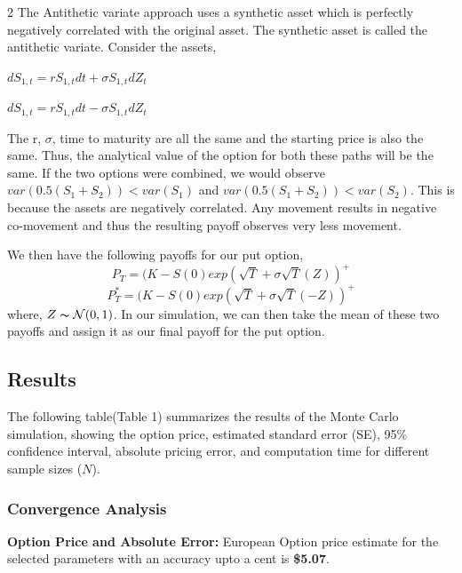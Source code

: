 \begin{multicols}{2}
The Antithetic variate approach uses a synthetic asset which is perfectly negatively correlated with the original asset. The synthetic asset is called the antithetic variate. Consider the assets,

$dS_{1,t} = rS_{1,t}dt + \sigma S_{1,t}dZ_t$

$dS_{1,t} = rS_{1,t}dt - \sigma S_{1,t}dZ_t$

The r, $\sigma$, time to maturity are all the same and the starting price is also the same. Thus, the analytical value of the option for both these paths will be the same. If the two options were combined, we would observe $var(0.5(S_1+S_2)) < var(S_1)$ and $var(0.5(S_1+S_2)) < var(S_2)$\cite{POUDEL}. This is because the assets are negatively correlated. Any movement results in  negative co-movement and thus the resulting payoff observes very less movement.

We then have the following payoffs for our put option,
$$
    P_{T} = (K - S(0) exp(\sqrt{T}+\sigma \sqrt{T}(Z))^+
$$
$$
    P_{T}^* = (K - S(0)exp(\sqrt{T}+\sigma \sqrt{T}(-Z))^+
$$
where, $Z \thicksim \mathcal{N}(0,1)$. In our simulation, we can then take the mean of these two payoffs and assign it as our final payoff for the put option.

\subsection{Results}
The following table(Table 1) summarizes the results of the Monte Carlo simulation, showing the option price, estimated standard error (SE), 95\% confidence interval, absolute pricing error, and computation time for different sample sizes (\(N\)).

\subsubsection{Convergence Analysis}
\textbf{Option Price and Absolute Error:}  
European Option price estimate for the selected parameters with an accuracy upto a cent is \textbf{\$5.07}. 


\end{multicols}

